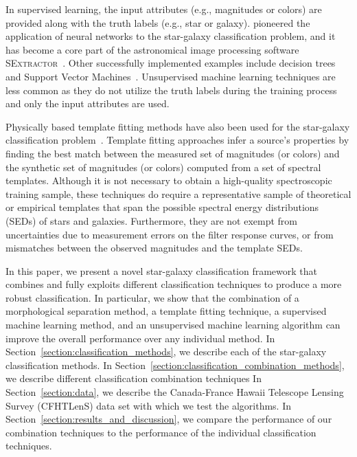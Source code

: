 \documentclass[useAMS,usenatbib]{mn2e}
\newcommand{\eg}{{e.g., }}
\begin{document}
In supervised learning, 
the input attributes (\eg magnitudes or colors)
are provided along with the truth labels (\eg star or galaxy).
\cite{odewahn1992automated} pioneered
the application of neural networks
to the star-galaxy classification problem,
and it has become a core part of
the astronomical image processing software
\textsc{SExtractor}~\citep{bertin1996sextractor}.
Other successfully implemented examples include
decision trees~\citep{weir1995automated, suchkov2005census, ball2006robust}
and Support Vector Machines~\citep{Fadely2012}.
Unsupervised machine learning techniques
are less common
as they do not utilize the truth labels during the training process
and only the input attributes are used.

Physically based template fitting methods
have also been used for the star-galaxy classification
problem~\citep{robin2007stellar, Fadely2012}.
Template fitting approaches infer a source's properties
by finding the best match between
the measured set of magnitudes (or colors)
and the synthetic set of magnitudes (or colors)
computed from a set of spectral templates.
Although it is not necessary to obtain
a high-quality spectroscopic training sample,
these techniques do require
a representative sample of theoretical or empirical templates
that span the possible spectral energy distributions (SEDs)
of stars and galaxies.
Furthermore, they are not exempt from uncertainties
due to measurement errors on the filter response curves,
or from mismatches between the observed magnitudes
and the template SEDs.

In this paper,
we present a novel star-galaxy classification framework
that combines and fully exploits different classification techniques
to produce a more robust classification.
In particular,
we show that the combination of a morphological separation method,
a template fitting technique, a supervised machine learning method,
and an unsupervised machine learning algorithm
can improve the overall performance over any individual method.
In Section~\ref{section:classification_methods},
we describe each of the star-galaxy classification methods.
In Section~\ref{section:classification_combination_methods},
we describe different classification combination techniques
In Section~\ref{section:data},
we describe the Canada-France Hawaii Telescope Lensing Survey (CFHTLenS)
data set with which we test the algorithms.
In Section~\ref{section:results_and_discussion},
we compare the performance of our combination techniques
to the performance of the individual classification techniques.
\end{document}

